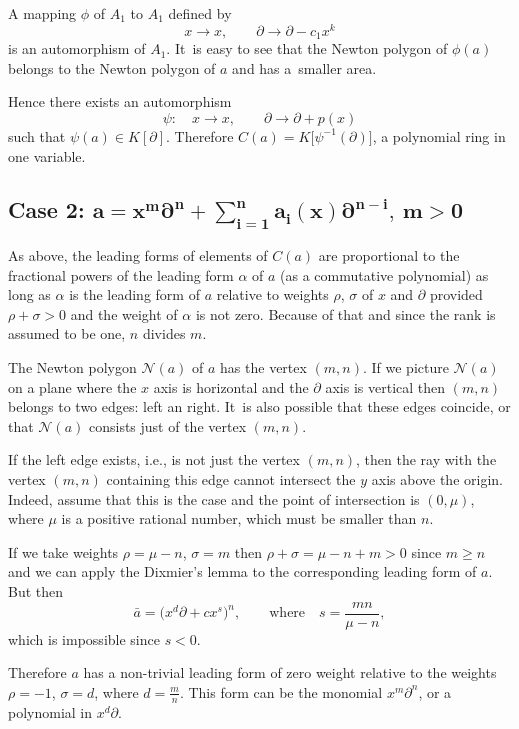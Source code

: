 \documentclass[10pt,a4paper]{amsart}
\numberwithin{equation}{section}
\newcommand{\de}{\partial}
\newcommand{\al}{\alpha}
\newcommand{\si}{\sigma}
\begin{document}
A mapping $\phi$ of $A_1$ to $A_1$ defined by
\[
x \rightarrow x, \qquad \de \rightarrow \de - c_1x^k
\]
is an automorphism of $A_1$. It~is easy to see that the Newton polygon of $\phi(a)$ belongs to the Newton polygon of $a$ and has a~smaller area.

Hence there exists an automorphism
\[
\psi\colon\quad x \rightarrow x, \qquad\de \rightarrow \de + p(x)
\]
such that $\psi(a) \in K[\de]$.
Therefore $C(a) = K\big[\psi^{-1}(\de)\big]$, a polynomial ring in one variable.

\subsection*{Case 2:
$\boldsymbol{\displaystyle a = x^m\de^n + \sum\limits_{i=1}^n a_i(x)\de^{n-i}, \ m > 0}$}

As above, the leading forms of elements of $C(a)$ are proportional to the
fractional powers of the leading form $\al$ of $a$ (as a commutative polynomial) as long as $\al$ is the
leading form of $a$ relative to weights $\rho$, $\sigma$ of $x$ and $\de$
provided $\rho + \sigma > 0$ and the weight of $\al$ is not zero. Because of
that and since the rank is assumed to be one, $n$ divides $m$.

The Newton polygon ${\mathcal N}(a)$ of $a$ has the vertex $(m,n)$.
If we picture ${\mathcal N}(a)$ on a plane where the $x$ axis is horizontal and the $\de$ axis is vertical then $(m,n)$ belongs to two edges: left an right.
It~is also possible that these edges coincide, or that ${\mathcal N}(a)$ consists just of the vertex $(m,n)$.

If the left edge exists, i.e., is not just the vertex $(m,n)$, then the ray with the vertex $(m,n)$ containing this edge cannot intersect the $y$ axis above the origin.
Indeed, assume that this is the case and the point of intersection is $(0, \mu)$, where $\mu$ is a positive rational number, which must be smaller than $n$.

If we take weights $\rho = \mu - n$, $\si = m$ then $\rho + \si = \mu - n + m > 0$ since $m \geq n$ and we can apply the Dixmier's lemma to the corresponding leading form of $a$.
But then
\[
\bar{a} = \big(x^d\de + cx^s\big)^n, \qquad
\text{where}\quad s = \frac{mn}{\mu - n},
\]
which is impossible since $s < 0$.

Therefore $a$ has a non-trivial leading form of zero weight relative to the weights $\rho = -1$, $\si = d$, where $d = \frac{m}{n}$. This form can be the monomial $x^m\de^n$, or a polynomial in $x^d\de$.
\end{document}
